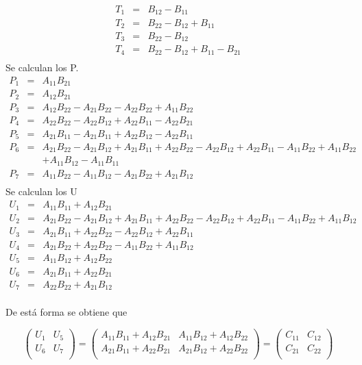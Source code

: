 \documentclass[12pt,letterpaper]{scrartcl}
\begin{document}
\[
\begin{array}{lcl}
	T_1 &=& B_12 - B_{11}\\
	T_2 &=& B_{22} - B_{12} + B_{11}\\
	T_3 &=& B_{22} - B_{12}\\
	T_4 &=& B_{22} - B_{12} + B_{11} - B_{21}\\
\end{array}
\]
Se calculan los P.
\[
\begin{array}{lcl}
	P_1 &=& A_{11}B_{21}\\
	P_2 &=& A_{12}B_{21}\\
	P_3 &=& A_{12}B_{22} - A_{21}B_{22} - A_{22}B_{22} + A_{11}B_{22}\\
	P_4 &=& A_{22}B_{22} - A_{22}B_{12} + A_{22}B_{11}  - A_{22}B_{21}\\
	P_5 &=& A_{21}B_{11} - A_{21}B_{11} + A_{22}B_{12}- A_{22}B_{11}\\
	P_6 &=& A_{21}B_{22} - A_{21}B_{12} + A_{21}B_{11} + A_{22}B_{22} - A_{22}B_{12} + A_{22}B_{11} - A_{11}B_{22}+ A_{11}B_{22}\\
	&&  + A_{11}B_{12} - A_{11}B_{11}\\
	P_7 &=& A_{11}B_{22} - A_{11}B_{12} - A_{21}B_{22} + A_{21}B_{12}\\
\end{array}
\]
Se calculan los U
\[
\begin{array}{lcl}
	U_{1} &=& A_{11}B_{11} + A_{12}B_{21}\\
	U_{2} &=& A_{21}B_{22} - A_{21}B_{12} + A_{21}B_{11} + A_{22}B_{22} - A_{22}B_{12} + A_{22}B_{11} - A_{11}B_{22} + A_{11}B_{12}\\
	U_{3} &=& A_{21}B_{11} + A_{22}B_{22} - A_{22}B_{12} + A_{22}B_{11}\\
	U_{4} &=& A_{21}B_{22} + A_{22}B_{22} - A_{11}B_{22} + A_{11}B_{12}\\
	U_{5} &=& A_{11}B_{12} + A_{12}B_{22}\\
	U_{6} &=& A_{21}B_{11} + A_{22}B_{21}\\
	U_{7} &=& A_{22}B_{22} + A_{21}B_{12}\\
\end{array}
\]

De está forma se obtiene que

$$
\begin{pmatrix}
	U_1 & U_5\\
	U_6 & U_7\\
\end{pmatrix}
 = \begin{pmatrix}
A_{11} B_{11} + A_{12} B_{21} & A_{11} B_{12} + A_{12} B_{22}\\
A_{21} B_{11} + A_{22} B_{21} & A_{21} B_{12} + A_{22} B_{22}\\
\end{pmatrix}
=
\begin{pmatrix}
C_{11} & C_{12} \\
C_{21} & C_{22}\\
\end{pmatrix}
$$
\end{document}
